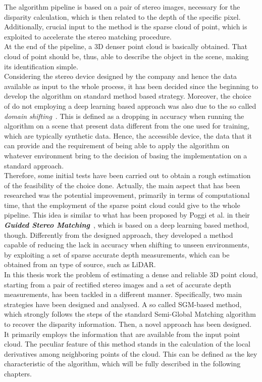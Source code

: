The algorithm pipeline is based on a pair of stereo images,  necessary for the disparity calculation, which is then related to the depth of the specific pixel.
Additionally, crucial input to the method is the sparse cloud of point, which is exploited to accelerate the stereo matching procedure.\\
At the end of the pipeline, a 3D denser point cloud is basically obtained.
That cloud of point should be, thus, able to describe the object in the scene, making its identification simple. \\
Considering the stereo device designed by the company and hence the data available as input to the whole process, it has been decided since the beginning to develop the algorithm on standard method based strategy. 
Moreover, the choice of do not employing a deep learning based approach was also due to the so called \textit{domain shifting}~\cite{Poggi2019}.
This is defined as a dropping in accuracy when running the algorithm on a scene that present data different from the one used for training, which are typically synthetic data. 
Hence, the accessible device, the data that it can provide and the requirement of being able to apply the algorithm on whatever environment bring to the decision of basing the implementation on a standard approach.\\
Therefore, some initial tests have been carried out to obtain a rough estimation of the feasibility of the choice done.
Actually, the main aspect that has been researched was the potential improvement, primarily in terms of computational time, that the employment of the sparse point cloud could give to the whole pipeline.
This idea is similar to what has been proposed by Poggi et al. in their \textbf{\textit{Guided Stereo Matching}}~\cite{Poggi2019}, which is based on a deep learning based method, though.
Differently from the designed approach, they developed a method capable of reducing the lack in accuracy when shifting to unseen environments, by exploiting a set of sparse accurate depth measurements, which can be obtained from an type of source, such as LiDAR.\\
In this thesis work the problem of estimating a dense and reliable 3D point cloud, starting from a pair of rectified stereo images and a set of accurate depth measurements, has been tackled in a different manner.
Specifically, two main strategies have been designed and analysed.
A so called SGM-based method, which strongly follows the steps of the standard Semi-Global Matching algorithm to recover the disparity information.
Then, a novel approach has been designed.
It primarily employs the information that are available from the input point cloud.
The peculiar feature of this method stands in the calculation of the local derivatives among neighboring points of the cloud.
This can be defined as the key characteristic of the algorithm, which will be fully described in the following chapters.

